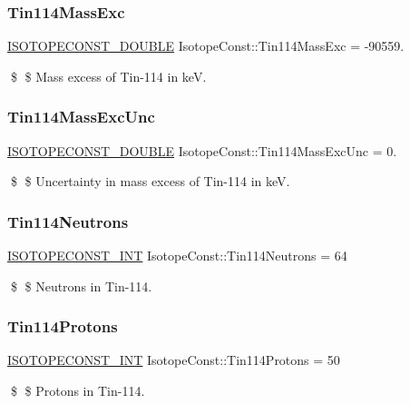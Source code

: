 \subsubsection{\texorpdfstring{Tin114\+Mass\+Exc}{Tin114MassExc}}
{\footnotesize\ttfamily \mbox{\hyperlink{group___isotope_const-_macros_ga8f45a7272ce02c0b4c65c44636ed719a}{I\+S\+O\+T\+O\+P\+E\+C\+O\+N\+S\+T\+\_\+\+D\+O\+U\+B\+LE}} Isotope\+Const\+::\+Tin114\+Mass\+Exc = -\/90559.}

\$ \$ Mass excess of Tin-\/114 in keV. \mbox{\label{group___isotope_const-_tin-_sn114_ga17826c015251d78bc2421237f9a92a3c}} 
\subsubsection{\texorpdfstring{Tin114\+Mass\+Exc\+Unc}{Tin114MassExcUnc}}
{\footnotesize\ttfamily \mbox{\hyperlink{group___isotope_const-_macros_ga8f45a7272ce02c0b4c65c44636ed719a}{I\+S\+O\+T\+O\+P\+E\+C\+O\+N\+S\+T\+\_\+\+D\+O\+U\+B\+LE}} Isotope\+Const\+::\+Tin114\+Mass\+Exc\+Unc = 0.}

\$ \$ Uncertainty in mass excess of Tin-\/114 in keV. \mbox{\label{group___isotope_const-_tin-_sn114_ga3697f6861d2a3e2298a0dce9e7c4cefc}} 
\subsubsection{\texorpdfstring{Tin114\+Neutrons}{Tin114Neutrons}}
{\footnotesize\ttfamily \mbox{\hyperlink{group___isotope_const-_macros_ga5f18360b3e99483a35c32d789e62621c}{I\+S\+O\+T\+O\+P\+E\+C\+O\+N\+S\+T\+\_\+\+I\+NT}} Isotope\+Const\+::\+Tin114\+Neutrons = 64}

\$ \$ Neutrons in Tin-\/114. \mbox{\label{group___isotope_const-_tin-_sn114_ga9e5486963bdda2ec4b3aa685c17c3ed4}} 
\subsubsection{\texorpdfstring{Tin114\+Protons}{Tin114Protons}}
{\footnotesize\ttfamily \mbox{\hyperlink{group___isotope_const-_macros_ga5f18360b3e99483a35c32d789e62621c}{I\+S\+O\+T\+O\+P\+E\+C\+O\+N\+S\+T\+\_\+\+I\+NT}} Isotope\+Const\+::\+Tin114\+Protons = 50}

\$ \$ Protons in Tin-\/114. 